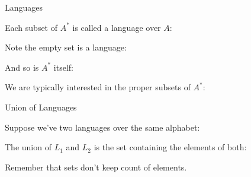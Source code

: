 \documentclass{beamer}
\begin{document}
\begin{frame}{Languages}

  \vspace{2mm}

  Each subset of $A^*$ is called a language over $A$:


  \vspace{2mm}

  Note the empty set is a language:


  \vspace{2mm}

  And so is $A^*$ itself:


  \vspace{2mm}

  We are typically interested in the \textcolor{gmitblue}{proper} subsets of $A^*$:


\end{frame}


\begin{frame}{Union of Languages}

  \vspace{2mm}

  Suppose we've two languages over the same alphabet:


  

  \vspace{2mm}

  The union of $L_1$ and $L_2$ is the set containing the elements of both:


  \vspace{2mm}

  Remember that sets don't keep count of elements.

\end{frame}
\end{document}
